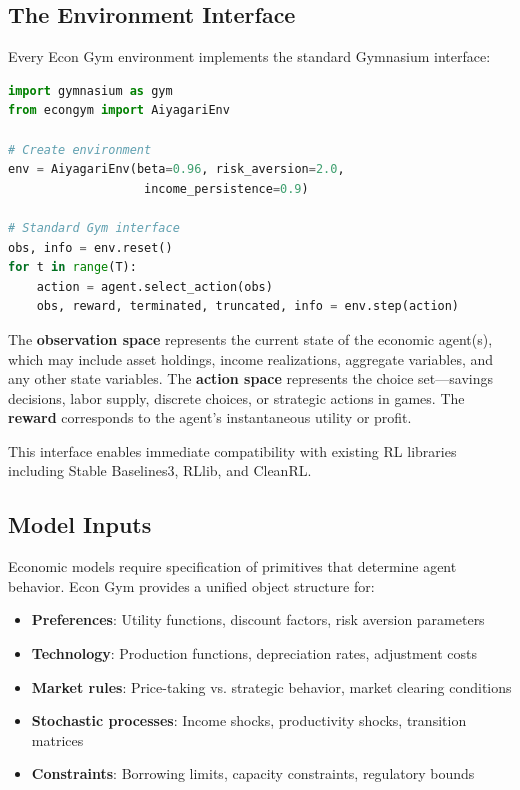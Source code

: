 \documentclass[12pt]{article}
\begin{document}
\subsection{The Environment Interface}

Every Econ Gym environment implements the standard Gymnasium interface:

\begin{lstlisting}[language=Python]
import gymnasium as gym
from econgym import AiyagariEnv

# Create environment
env = AiyagariEnv(beta=0.96, risk_aversion=2.0, 
                   income_persistence=0.9)

# Standard Gym interface
obs, info = env.reset()
for t in range(T):
    action = agent.select_action(obs)
    obs, reward, terminated, truncated, info = env.step(action)
\end{lstlisting}

The \textbf{observation space} represents the current state of the economic agent(s), which may include asset holdings, income realizations, aggregate variables, and any other state variables. The \textbf{action space} represents the choice set---savings decisions, labor supply, discrete choices, or strategic actions in games. The \textbf{reward} corresponds to the agent's instantaneous utility or profit.

This interface enables immediate compatibility with existing RL libraries including Stable Baselines3, RLlib, and CleanRL.

\subsection{Model Inputs}

Economic models require specification of primitives that determine agent behavior. Econ Gym provides a unified object structure for:

\begin{itemize}
    \item \textbf{Preferences}: Utility functions, discount factors, risk aversion parameters
    \item \textbf{Technology}: Production functions, depreciation rates, adjustment costs
    \item \textbf{Market rules}: Price-taking vs. strategic behavior, market clearing conditions
    \item \textbf{Stochastic processes}: Income shocks, productivity shocks, transition matrices
    \item \textbf{Constraints}: Borrowing limits, capacity constraints, regulatory bounds
\end{itemize}
\end{document}
